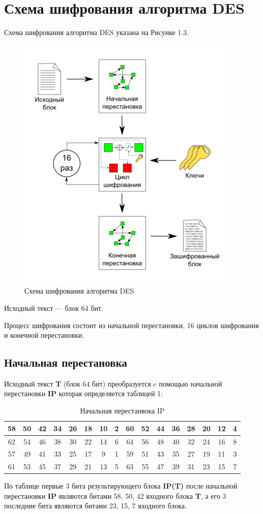 \section{Схема шифрования алгоритма DES}
Схема шифрования алгоритма DES указана на Рисунке 1.3.
\begin{figure}[H]
\centering
\includegraphics[scale=0.85]{pict/DES_algorithm_scheme.png}
\caption{Схема шифрования алгоритма DES}
\end{figure}

Исходный текст — блок 64 бит.

Процесс шифрования состоит из начальной перестановки, 16 циклов шифрования и конечной перестановки.

\subsection{Начальная перестановка}
Исходный текст \textbf{T} (блок 64 бит) преобразуется c помощью начальной перестановки \textbf{IP} которая определяется таблицей 1:
\begin{table}[H]
    \caption{Начальная перестанвока IP}
	\begin{tabular}{|c|c|c|c|c|c|c|c|c|c|c|c|c|c|c|c|}
    \hline
    58 & 50 & 42 & 34 & 26 & 18 & 10 & 2 & 60 & 52 & 44 & 36 & 28 & 20 & 12 & 4\\
    \hline
    62 &	54 &	46 &	38 &	30 &	22 &	14 &	6 &	64 &	56 &	48 &	40 &	32 &	24 &	16 &	8\\
    \hline
    57 &	49 &	41 &	33 &	25 &	17 &	9 &	1 &	59 &	51 &	43 &	35 &	27 &	19 &	11 &	3\\
    \hline
    61 &	53 &	45 &	37 &	29 &	21 &	13 &	5 &	63 &	55 &	47 &	39 &	31 &	23 &	15 &	7\\
    \hline
	\end{tabular}
\end{table}
По таблице первые 3 бита результирующего блока \textbf{IP(T)} после начальной перестановки \textbf{IP} являются битами 58, 50, 42 входного блока \textbf{T}, а его 3 последние бита являются битами 23, 15, 7 входного блока.

